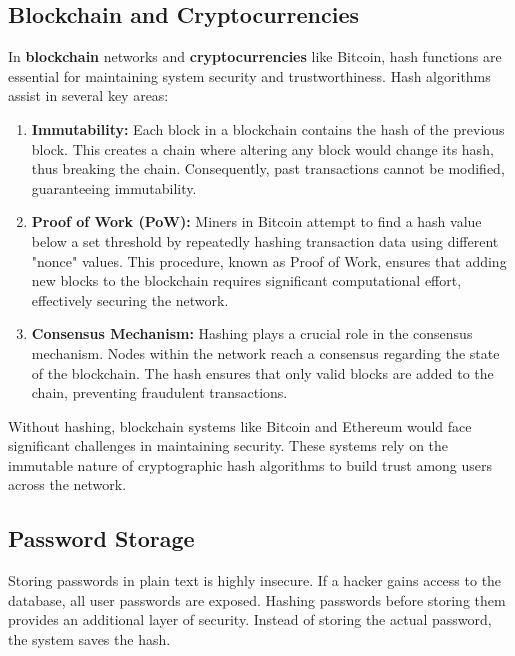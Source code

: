 \documentclass[11pt,a4paper]{article}
\begin{document}
    \subsection*{Blockchain and Cryptocurrencies}
    In \textbf{blockchain} networks and \textbf{cryptocurrencies} like Bitcoin, hash functions are essential for maintaining system security and trustworthiness. Hash algorithms assist in several key areas:
        \begin{enumerate}
            \item \textbf{Immutability:} Each block in a blockchain contains the hash of the previous block. This creates a chain where altering any block would change its hash, thus breaking the chain. Consequently, past transactions cannot be modified, guaranteeing immutability.

            \item \textbf{Proof of Work (PoW):} Miners in Bitcoin attempt to find a hash value below a set threshold by repeatedly hashing transaction data using different "nonce" values. This procedure, known as Proof of Work, ensures that adding new blocks to the blockchain requires significant computational effort, effectively securing the network.

            \item \textbf{Consensus Mechanism:} Hashing plays a crucial role in the consensus mechanism. Nodes within the network reach a consensus regarding the state of the blockchain. The hash ensures that only valid blocks are added to the chain, preventing fraudulent transactions.

        \end{enumerate}
        Without hashing, blockchain systems like Bitcoin and Ethereum would face significant challenges in maintaining security. These systems rely on the immutable nature of cryptographic hash algorithms to build trust among users across the network.

    \subsection*{Password Storage}
    Storing passwords in plain text is highly insecure. If a hacker gains access to the database, all user passwords are exposed. Hashing passwords before storing them provides an additional layer of security. Instead of storing the actual password, the system saves the hash.
    
\end{document}
